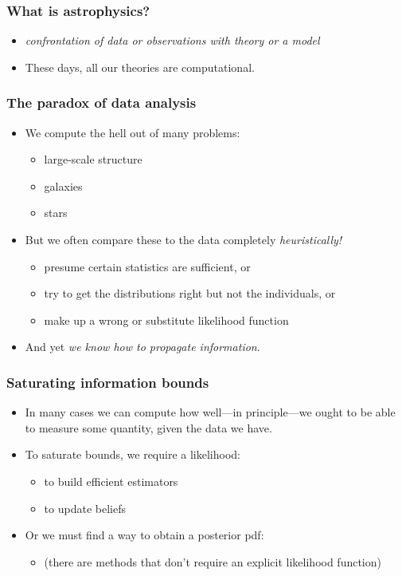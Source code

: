 \documentclass[pdftex]{beamer}
\begin{document}
\begin{frame}
  \frametitle{What is astrophysics?}
  \begin{itemize}
  \item \emph{confrontation of data or observations with theory or a model}
  \item These days, all our theories are computational.
  \end{itemize}
\end{frame}

\begin{frame}
  \frametitle{The paradox of data analysis}
  \begin{itemize}
  \item We compute the hell out of many problems:
    \begin{itemize}
    \item large-scale structure
    \item galaxies
    \item stars
    \end{itemize}
  \item But we often compare these to the data completely \emph{heuristically!}
    \begin{itemize}
    \item presume certain statistics are sufficient, or
    \item try to get the distributions right but not the individuals, or
    \item make up a wrong or substitute likelihood function
    \end{itemize}
  \item And yet \emph{we know how to propagate information}.
  \end{itemize}
\end{frame}

\begin{frame}
  \frametitle{Saturating information bounds}
  \begin{itemize}
  \item In many cases we can compute how well---in principle---we ought to be able to
    measure some quantity, given the data we have.
  \item To saturate bounds, we require a likelihood:
    \begin{itemize}
    \item to build efficient estimators
    \item to update beliefs
    \end{itemize}
  \item Or we must find a way to obtain a posterior pdf:
    \begin{itemize}
    \item (there are methods that don't require an explicit likelihood function)
    \end{itemize}
  \end{itemize}
\end{frame}
\end{document}
